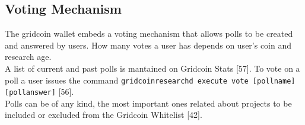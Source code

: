 \subsection{Voting Mechanism}

The gridcoin wallet embeds a voting mechanism that allows polls to be created and answered by users. How many votes a user has depends on user's coin and research age.\\

A list of current and past polls is mantained on Gridcoin Stats [57]. To vote on a poll a user issues the command \texttt{gridcoinresearchd execute vote [pollname] [pollanswer]} [56].\\

Polls can be of any kind, the most important ones related about projects to be included or excluded from the Gridcoin Whitelist [42].